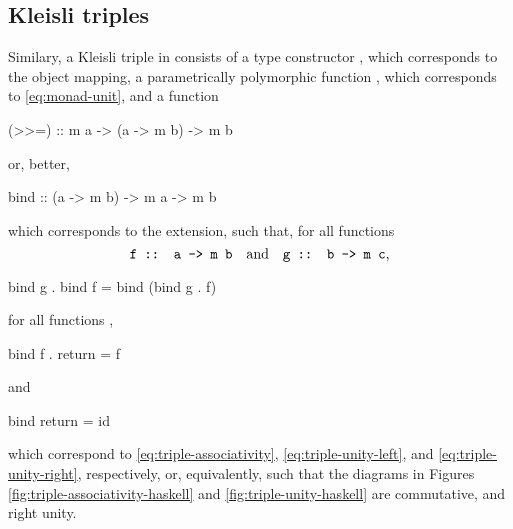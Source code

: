 \begin{example}
  \vspace{1em}
  \caseh{[]}
  \begin{steps}
    \steph{[]}
  \end{steps}
  \begin{steps}
      \eqbyih
      \eqbydefh{(++)}
  \end{steps}

\end{example}

\subsection*{Kleisli triples}


Similary, a Kleisli triple in \hask consists of a type constructor
, which corresponds to the object mapping, a
parametrically polymorphic function , which corresponds to
\eqref{eq:monad-unit}, and a function
\begin{codehaskell}
(>>=) :: m a -> (a -> m b) -> m b
\end{codehaskell}
or, better,
\begin{codehaskell}
bind :: (a -> m b) -> m a -> m b
\end{codehaskell}
which corresponds to the extension, such that, for all functions
\begin{equation*}
  \text{\texttt{f :: a -> m b}}
  \quad
  \text{and}
  \quad
  \text{\texttt{g :: b -> m c}}
  \text{,}
\end{equation*}
\begin{codehaskell}
bind g . bind f = bind (bind g . f)
\end{codehaskell}
for all functions ,
\begin{codehaskell}
bind f . return = f
\end{codehaskell}
and
\begin{codehaskell}
bind return = id
\end{codehaskell}
which correspond to \eqref{eq:triple-associativity},
\eqref{eq:triple-unity-left}, and \eqref{eq:triple-unity-right},
respectively, or, equivalently, such that the diagrams in Figures
\ref{fig:triple-associativity-haskell} and
\ref{fig:triple-unity-haskell} are commutative, and right unity.

